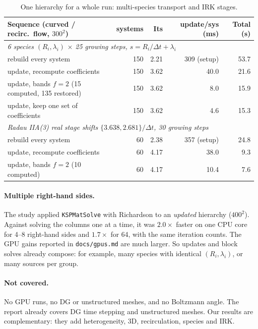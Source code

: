 \documentclass[11pt,a4paper]{article}
\begin{document}
\begin{table}[h]\centering\small
\begin{tabular}{lrrrr}
\toprule
Sequence (curved / recirc.\ flow, $300^2$) & systems & Its & update/sys (ms) & Total (s)\\\midrule
\multicolumn{5}{l}{\emph{6 species $(R_i,\lambda_i)$ $\times$ 25 growing steps, $s=R_i/\Delta t+\lambda_i$}}\\
\quad rebuild every system & 150 & 2.21 & 309 (setup) & 53.7\\
\quad update, recompute coefficients & 150 & 3.62 & 40.0 & 21.6\\
\quad update, bands $f=2$ (15 computed, 135 restored) & 150 & 3.62 & 8.0 & 15.9\\
\quad update, keep one set of coefficients & 150 & 3.62 & 4.6 & 15.3\\\midrule
\multicolumn{5}{l}{\emph{Radau IIA(3) real stage shifts $\{3.638,2.681\}/\Delta t$, 30 growing steps}}\\
\quad rebuild every system & 60 & 2.38 & 357 (setup) & 24.8\\
\quad update, recompute coefficients & 60 & 4.17 & 38.0 & 9.3\\
\quad update, bands $f=2$ (10 computed) & 60 & 4.17 & 10.4 & 7.6\\
\bottomrule
\end{tabular}
\caption{One hierarchy for a whole run: multi-species transport and IRK stages.}\label{tab:seq}
\end{table}

\paragraph{Multiple right-hand sides.} The study applied \texttt{KSPMatSolve} with Richardson to an \emph{updated} hierarchy ($400^2$). Against solving the columns one at a time, it was $2.0\times$ faster on one CPU core for 4--8 right-hand sides and $1.7\times$ for 64, with the same iteration counts. The GPU gains reported in \texttt{docs/gpus.md} are much larger. So updates and block solves already compose: for example, many species with identical $(R_i,\lambda_i)$, or many sources per group.

\paragraph{Not covered.} No GPU runs, no DG or unstructured meshes, and no Boltzmann angle. The report already covers DG time stepping and unstructured meshes. Our results are complementary: they add heterogeneity, 3D, recirculation, species and IRK.
\end{document}
